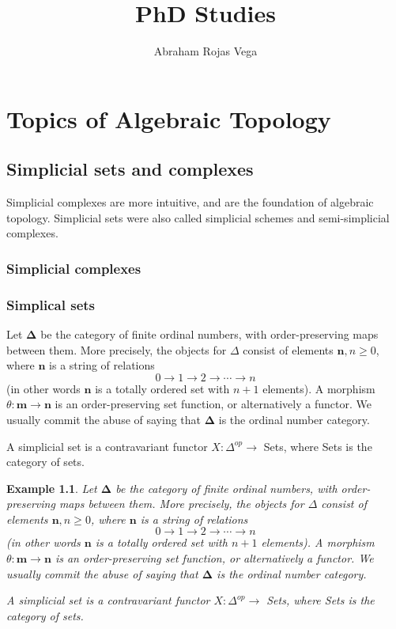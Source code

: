 \documentclass{book}
\title{PhD Studies}
\author{Abraham Rojas Vega}
\newtheorem{example}{Example}
\begin{document}
\maketitle

\tableofcontents
\part*{Topics of Algebraic Topology}

\chapter{Simplicial sets and complexes}

Simplicial complexes are more intuitive, and are the foundation of algebraic topology. Simplicial sets were also called simplicial schemes and semi-simplicial complexes. 

\section{Simplicial complexes}



\section{Simplical sets}

Let $\mathbf{\Delta}$ be the category of finite ordinal numbers, with order-preserving maps between them. More precisely, the objects for $\Delta$ consist of elements $\mathbf{n}, n \geq 0$, where $\mathbf{n}$ is a string of relations
$$
0 \rightarrow 1 \rightarrow 2 \rightarrow \cdots \rightarrow n
$$
(in other words $\mathbf{n}$ is a totally ordered set with $n+1$ elements). A morphism $\theta: \mathbf{m} \rightarrow \mathbf{n}$ is an order-preserving set function, or alternatively a functor. We usually commit the abuse of saying that $\mathbf{\Delta}$ is the ordinal number category.

A simplicial set is a contravariant functor $X: \Delta^{o p} \rightarrow$ Sets, where Sets is the category of sets.

\begin{example}
    Let $\boldsymbol{\Delta}$ be the category of finite ordinal numbers, with order-preserving maps between them. More precisely, the objects for $\Delta$ consist of elements $\mathbf{n}, n \geq 0$, where $\mathbf{n}$ is a string of relations
$$
0 \rightarrow 1 \rightarrow 2 \rightarrow \cdots \rightarrow n
$$
(in other words $\mathbf{n}$ is a totally ordered set with $n+1$ elements). A morphism $\theta: \mathbf{m} \rightarrow \mathbf{n}$ is an order-preserving set function, or alternatively a functor. We usually commit the abuse of saying that $\boldsymbol{\Delta}$ is the ordinal number category.

A simplicial set is a contravariant functor $X: \Delta^{o p} \rightarrow$ Sets, where Sets is the category of sets.
\end{example}
\end{document}

